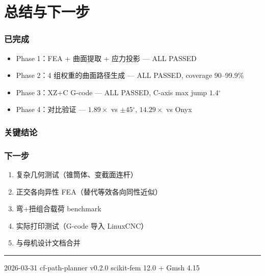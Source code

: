 \documentclass[11pt,a4paper]{article}
\begin{document}
\newpage
\part{总结与下一步}

\section{已完成}

\begin{itemize}[nosep]
\item Phase 1：FEA + 曲面提取 + 应力投影 --- ALL PASSED
\item Phase 2：4 组权重的曲面路径生成 --- ALL PASSED, coverage 90--99.9\%
\item Phase 3：XZ+C G-code --- ALL PASSED, C-axis max jump $1.4$$^\circ$
\item Phase 4：对比验证 --- $1.89\times$ vs $\pm 45$$^\circ$, $14.29\times$ vs Onyx
\end{itemize}

\section{关键结论}

\noindent{}

\section{下一步}

\begin{enumerate}[nosep]
\item 复杂几何测试（锥筒体、变截面连杆）
\item 正交各向异性 FEA（替代等效各向同性近似）
\item 弯+扭组合载荷 benchmark
\item 实际打印测试（G-code 导入 LinuxCNC）
\item 与母机设计文档合并
\end{enumerate}

\vfill
\noindent\rule{\textwidth}{0.5pt}
{\small 2026-03-31 \quad cf-path-planner v0.2.0 \quad scikit-fem 12.0 + Gmsh 4.15}
\end{document}
